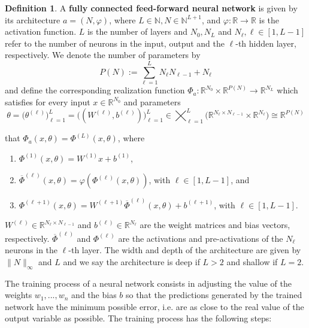 \documentclass[11pt]{article}
\theoremstyle{definition}
\newtheorem{defn}{Definition}
\begin{document}
\begin{defn}
A \textbf{fully connected feed-forward neural network} is given by its architecture $a = (N, \varphi)$, where $L \in \mathbb{N}, N \in \mathbb{N}^{L+1}$, and $\varphi: \mathbb{R} \rightarrow \mathbb{R}$ is the activation function. $L$ is the number of layers and $N_0, N_L$ and $N_\ell, \ell \in [1, L-1]$ refer to the number of neurons in the input, output and the $\ell$-th hidden layer, respectively. We denote the number of parameters by 
    \begin{equation*}
        P(N):= \sum_{\ell=1}^L N_{\ell} N_{\ell-1} + N_{\ell}
    \end{equation*}
and define the corresponding realization function $\Phi_a: \mathbb{R}^{N_0} \times \mathbb{R}^{P(N)} \rightarrow \mathbb{R}^{N_L}$ which satisfies for every input $x \in \mathbb{R}^{N_0}$ and parameters 
    \begin{equation*}
        \theta = \big( \theta^{(\ell)} \big)^L_{\ell=1} = \big((W^{(\ell)}, b^{(\ell)}) \big)^L_{\ell = 1} \in \bigtimes^L_{\ell=1} \big( \mathbb{R}^{N_{\ell}\times N_{\ell -1}} \times \mathbb{R}^{N_{\ell}} \big) \cong \mathbb{R}^{P(N)}    
    \end{equation*}

that $\Phi_a(x, \theta) = \Phi^{(L)}(x, \theta)$, where
    \begin{enumerate}[label=\roman*.]
        \item $\Phi^{(1)}(x, \theta) = W^{(1)}x + b^{(1)}$, 
        \item $\overline{\Phi}^{(\ell)}(x, \theta) = \varphi (\Phi^{(\ell)}(x, \theta))$, with $\ell \in [1, L-1]$, and 
        \item $\Phi^{(\ell+1)}(x, \theta) = W^{(\ell+1)}\overline{\Phi}^{(\ell)}(x, \theta) + b^{(\ell + 1)}$, with $\ell \in [1, L-1]$.
    \end{enumerate}
$W^{(\ell)} \in \mathbb{R}^{N_{\ell} \times N_{\ell-1}}$ and $b^{(\ell)} \in \mathbb{R}^{N_{\ell}}$ are the weight matrices and bias vectors, respectively. $\overline{\Phi}^{(\ell)}$ and $\Phi^{(\ell)}$ are the activations and pre-activations of the $N_ {\ell}$ neurons in the $\ell$-th layer. The width and depth of the architecture are given by $\lVert N \rVert_{\infty}$ and $L$ and we say the architecture is deep if $L>2$ and shallow if $L=2$.
\end{defn}

The training process of a neural network consists in adjusting the value of the weights $w_1, ..., w_n$ and the bias $b$ so that the predictions generated by the trained network have the minimum possible error, i.e. are as close to the real value of the output variable as possible. The training process has the following steps: 
\end{document}
